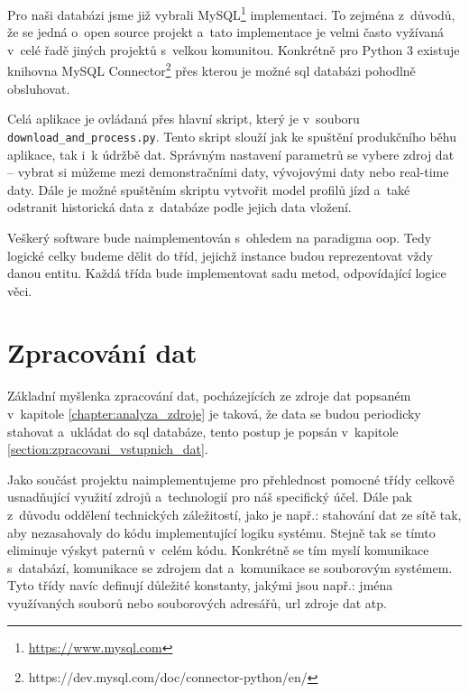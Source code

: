 \bigbreak


Pro naši databázi jsme již vybrali MySQL\footnote{\url{https://www.mysql.com}} implementaci. To zejména z~důvodů, že se jedná o~open source projekt a~tato implementace je velmi často vyžívaná v~celé řadě jiných projektů s~velkou komunitou. Konkrétně pro Python 3 existuje knihovna MySQL Connector\footnote{https://dev.mysql.com/doc/connector-python/en/} přes kterou je možné \gls{sql} databázi pohodlně obsluhovat.


\bigbreak


Celá aplikace je ovládaná přes hlavní skript, který je v~souboru \texttt{download\_and\allowbreak\_process.py}. Tento skript slouží jak ke spuštění produkčního běhu aplikace, tak i~k údržbě dat. Správným nastavení parametrů se vybere zdroj dat -- vybrat si můžeme mezi demonstračními daty, vývojovými daty nebo real-time daty. Dále je možné spuštěním skriptu vytvořit model profilů jízd a~také odstranit historická data z~databáze podle jejich data vložení.


\bigbreak


Veškerý software bude naimplementován s~ohledem na paradigma \gls{oop}. Tedy logické celky budeme dělit do tříd, jejichž instance budou reprezentovat vždy danou entitu. Každá třída bude implementovat sadu metod, odpovídající logice věci.


\section{Zpracování dat} \label{section:zpracovani_dat}


Základní myšlenka zpracování dat, pocházejících ze zdroje dat popsaném v~kapitole \ref{chapter:analyza_zdroje} je taková, že data se budou periodicky stahovat a~ukládat do \gls{sql} databáze, tento postup je popsán v~kapitole \ref{section:zpracovani_vstupnich_dat}.


\bigbreak

Jako součást projektu naimplementujeme pro přehlednost pomocné třídy celkově usnadňující využití zdrojů a~technologií pro náš specifický účel. Dále pak z~důvodu oddělení technických záležitostí, jako je např.: stahování dat ze sítě tak, aby nezasahovaly do kódu implementující logiku systému. Stejně tak se tímto eliminuje výskyt paternů v~celém kódu. Konkrétně se tím myslí komunikace s~databází, komunikace se zdrojem dat a~komunikace se souborovým systémem. Tyto třídy navíc definují důležité konstanty, jakými jsou např.: jména využívaných souborů nebo souborových adresářů, \gls{url} zdroje dat atp.


